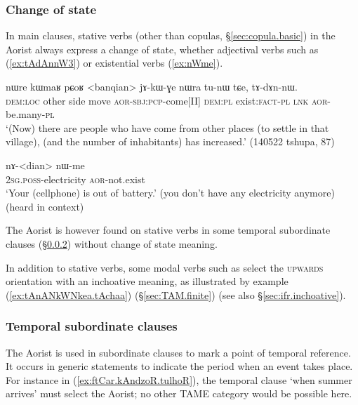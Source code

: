 \subsubsection{Change of state}   \label{sec:aor.inchoative}
In main clauses, stative verbs (other than copulas, §\ref{sec:copula.basic}) in the Aorist always express a change of state, whether adjectival verbs such as  (\ref{ex:tAdAnnW3}) or existential verbs (\ref{ex:nWme}).

\begin{exe}
\ex \label{ex:tAdAnnW3}
 \gll nɯre kɯmaʁ pɕoʁ <banqian> jɤ-kɯ-ɣe nɯra tu-nɯ tɕe, tɤ-dɤn-nɯ. \\
 \textsc{dem}:\textsc{loc} other side move \textsc{aor}-\textsc{sbj}:\textsc{pcp}-come[II] \textsc{dem}:\textsc{pl} exist:\textsc{fact}-\textsc{pl} \textsc{lnk} \textsc{aor}-be.many-\textsc{pl} \\
 \glt `(Now) there are people who have come from other places (to settle in that village), (and the number of inhabitants) has increased.' (140522 tshupa, 87)
\end{exe}


\begin{exe}
\ex \label{ex:nWme}
 \gll nɤ-<dian> nɯ-me \\
 \textsc{2sg}.\textsc{poss}-electricity \textsc{aor}-not.exist \\
 \glt `Your (cellphone) is out of battery.' (you don't have any electricity anymore) (heard in context)
\end{exe}

The Aorist is however found on stative verbs in some temporal subordinate clauses (§\ref{sec:aor.temporal}) without change of state meaning. 

In addition to stative verbs, some modal verbs such as  select the \textsc{upwards} orientation with an inchoative meaning, as illustrated by example (\ref{ex:tAnANkWNkea.tAchaa}) (§\ref{sec:TAM.finite}) (see also §\ref{sec:ifr.inchoative}).
 


\subsubsection{Temporal subordinate clauses }   \label{sec:aor.temporal}
The Aorist is used in subordinate clauses to mark a point of temporal reference. It occurs in generic statements to indicate the period when an event takes place. For instance in  (\ref{ex:ftCar.kAndzoR.tulhoR}), the temporal clause  `when summer arrives' must select the Aorist; no other TAME category would be possible here.

